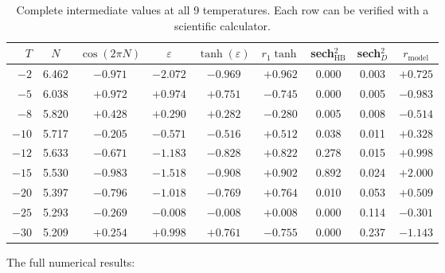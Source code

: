 \documentclass[12pt,letterpaper]{article}
\begin{document}
\begin{table}[H]
\centering
\caption{Complete intermediate values at all 9 temperatures.  Each row can be verified with a scientific calculator.}
\label{tab:intermediates}
\small
\begin{tabular}{@{}r|ccc|cc|cc|c@{}}
\toprule
$T$ & $N$ & $\cos(2\pi N)$ & $\varepsilon$ & $\tanh(\varepsilon)$ & $r_1\tanh$ & sech$^2_{\mathrm{HB}}$ & sech$^2_D$ & $r_{\mathrm{model}}$ \\
\midrule
$-2$  & 6.462 & $-0.971$ & $-2.072$ & $-0.969$ & $+0.962$ & 0.000 & 0.003 & $+0.725$ \\
$-5$  & 6.038 & $+0.972$ & $+0.974$ & $+0.751$ & $-0.745$ & 0.000 & 0.005 & $-0.983$ \\
$-8$  & 5.820 & $+0.428$ & $+0.290$ & $+0.282$ & $-0.280$ & 0.005 & 0.008 & $-0.514$ \\
$-10$ & 5.717 & $-0.205$ & $-0.571$ & $-0.516$ & $+0.512$ & 0.038 & 0.011 & $+0.328$ \\
$-12$ & 5.633 & $-0.671$ & $-1.183$ & $-0.828$ & $+0.822$ & 0.278 & 0.015 & $+0.998$ \\
$-15$ & 5.530 & $-0.983$ & $-1.518$ & $-0.908$ & $+0.902$ & 0.892 & 0.024 & $+2.000$ \\
$-20$ & 5.397 & $-0.796$ & $-1.018$ & $-0.769$ & $+0.764$ & 0.010 & 0.053 & $+0.509$ \\
$-25$ & 5.293 & $-0.269$ & $-0.008$ & $-0.008$ & $+0.008$ & 0.000 & 0.114 & $-0.301$ \\
$-30$ & 5.209 & $+0.254$ & $+0.998$ & $+0.761$ & $-0.755$ & 0.000 & 0.237 & $-1.143$ \\
\bottomrule
\end{tabular}
\end{table}

The full numerical results:
\end{document}
